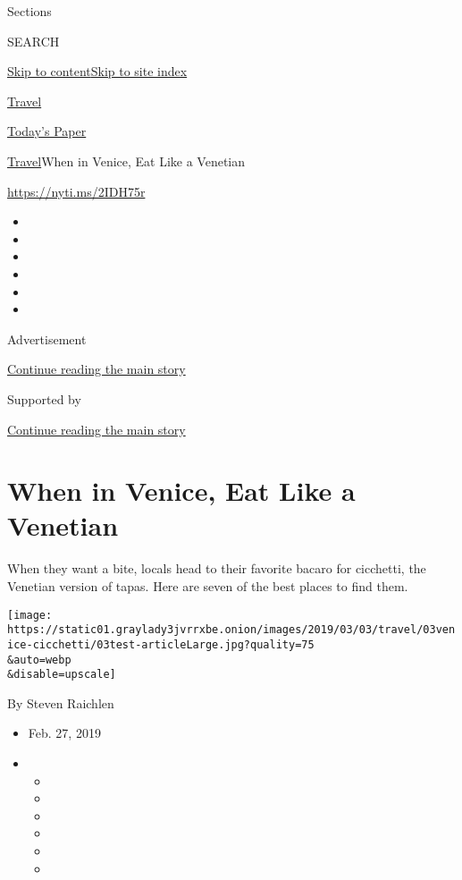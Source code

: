Sections

SEARCH

\protect\hyperlink{site-content}{Skip to
content}\protect\hyperlink{site-index}{Skip to site index}

\href{https://www.nytimes3xbfgragh.onion/section/travel}{Travel}

\href{https://myaccount.nytimes3xbfgragh.onion/auth/login?response_type=cookie\&client_id=vi}{}

\href{https://www.nytimes3xbfgragh.onion/section/todayspaper}{Today's
Paper}

\href{/section/travel}{Travel}\textbar{}When in Venice, Eat Like a
Venetian

\url{https://nyti.ms/2IDH75r}

\begin{itemize}
\item
\item
\item
\item
\item
\item
\end{itemize}

Advertisement

\protect\hyperlink{after-top}{Continue reading the main story}

Supported by

\protect\hyperlink{after-sponsor}{Continue reading the main story}

\hypertarget{when-in-venice-eat-like-a-venetian}{%
\section{When in Venice, Eat Like a
Venetian}\label{when-in-venice-eat-like-a-venetian}}

When they want a bite, locals head to their favorite bacaro for
cicchetti, the Venetian version of tapas. Here are seven of the best
places to find them.

\texttt{[image: https://static01.graylady3jvrrxbe.onion/images/2019/03/03/travel/03venice-cicchetti/03test-articleLarge.jpg?quality=75\\\&auto=webp\\\&disable=upscale]}

By Steven Raichlen

\begin{itemize}
\item
  Feb. 27, 2019
\item
  \begin{itemize}
  \item
  \item
  \item
  \item
  \item
  \item
  \end{itemize}
\end{itemize}

